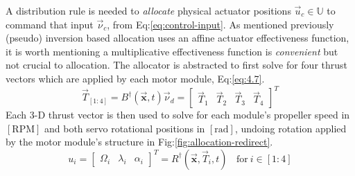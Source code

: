 \par
A distribution rule is needed to \emph{allocate} physical actuator positions $\vec{u}_c\in\mathbb{U}$ to command that input $\vec{\nu}_c$, from Eq:\ref{eq:control-input}. As mentioned previously (pseudo) inversion based allocation uses an affine actuator effectiveness function, it is worth mentioning a multiplicative effectiveness function is \emph{convenient} but not crucial to allocation. The allocator is abstracted to first solve for four thrust vectors which are applied by each motor module, Eq:\ref{eq:4.7}.
\begin{equation}\label{eq:5.1}
\vec{T}_{[1:4]}=B^{\dagger}(\vec{\mathbf{x}},t)\vec{\nu}_d=\begin{bmatrix}
\vec{T}_1&\vec{T}_2&\vec{T}_3&\vec{T}_4
\end{bmatrix}^T
\end{equation}
Each 3-D thrust vector is then used to solve for each module's propeller speed in $[\text{RPM}]$ and both servo rotational positions in $[\text{rad}]$, undoing rotation applied by the motor module's structure in Fig:\ref{fig:allocation-redirect}.
\begin{equation}
u_i = \begin{bmatrix}\Omega_i&\lambda_i&\alpha_i\end{bmatrix}^T=R^\dagger(\vec{\mathbf{x}},\vec{T}_i,t)~~~~\text{for}~i\in[1:4]
\end{equation}
